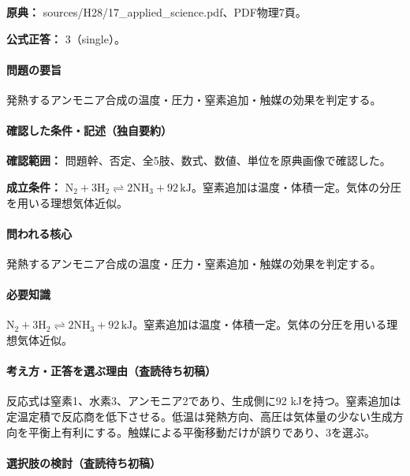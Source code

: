 \noindent\textbf{原典：} sources/H28/17\_applied\_science.pdf、PDF物理7頁。

\textbf{公式正答：} 3（single）。

\paragraph{問題の要旨} 発熱するアンモニア合成の温度・圧力・窒素追加・触媒の効果を判定する。

\paragraph{確認した条件・記述（独自要約）}\mbox{}\par

\noindent\textbf{確認範囲：} 問題幹、否定、全5肢、数式、数値、単位を原典画像で確認した。\par

\noindent\textbf{成立条件：} \(\mathrm{N_2+3H_2\rightleftharpoons2NH_3}+92\,\mathrm{kJ}\)。窒素追加は温度・体積一定。気体の分圧を用いる理想気体近似。\par

\paragraph{問われる核心} 発熱するアンモニア合成の温度・圧力・窒素追加・触媒の効果を判定する。

\paragraph{必要知識} \(\mathrm{N_2+3H_2\rightleftharpoons2NH_3}+92\,\mathrm{kJ}\)。窒素追加は温度・体積一定。気体の分圧を用いる理想気体近似。

\paragraph{考え方・正答を選ぶ理由（査読待ち初稿）} 反応式は窒素1、水素3、アンモニア2であり、生成側に92 kJを持つ。窒素追加は定温定積で反応商を低下させる。低温は発熱方向、高圧は気体量の少ない生成方向を平衡上有利にする。触媒による平衡移動だけが誤りであり、3を選ぶ。

\paragraph{選択肢の検討（査読待ち初稿）}\mbox{}\par

